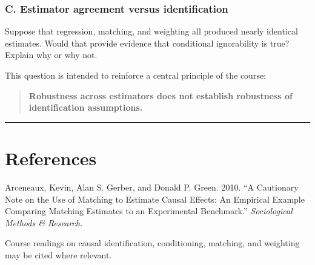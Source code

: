 \documentclass[
]{article}
\begin{document}
\subsubsection{C. Estimator agreement versus
identification}\label{c.-estimator-agreement-versus-identification}

Suppose that regression, matching, and weighting all produced nearly
identical estimates. Would that provide evidence that conditional
ignorability is true? Explain why or why not.

This question is intended to reinforce a central principle of the
course:

\begin{quote}
\textbf{Robustness across estimators does not establish robustness of
identification assumptions.}
\end{quote}

\begin{center}\rule{0.5\linewidth}{0.5pt}\end{center}

\section{References}\label{references}

Arceneaux, Kevin, Alan S. Gerber, and Donald P. Green. 2010. ``A
Cautionary Note on the Use of Matching to Estimate Causal Effects: An
Empirical Example Comparing Matching Estimates to an Experimental
Benchmark.'' \emph{Sociological Methods \& Research}.

Course readings on causal identification, conditioning, matching, and
weighting may be cited where relevant.
\end{document}
